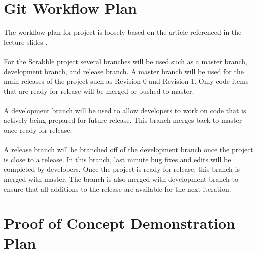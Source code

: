 \documentclass{article}
\begin{document}
\section{Git Workflow Plan}
The workflow plan for project is loosely based on the article referenced in the lecture slides \cite{driessen_2010}. \\ \\
For the Scrabble project several branches will be used such as a master branch, development branch, and release branch. A master branch will be used for the main releases of the project such as Revision 0 and Revision 1. Only code items that are ready for release will be merged or pushed to master.\\ \\
A development branch will be used to allow developers to work on code that is actively being prepared for future release. This branch merges back to master once ready for release. \\ \\
A release branch will be branched off of the development branch once the project is close to a release. In this branch, last minute bug fixes and edits will be completed by developers. Once the project is ready for release, this branch is merged with master. The branch is also merged with development branch to ensure that all additions to the release are available for the next iteration.

\section{Proof of Concept Demonstration Plan}
\end{document}
